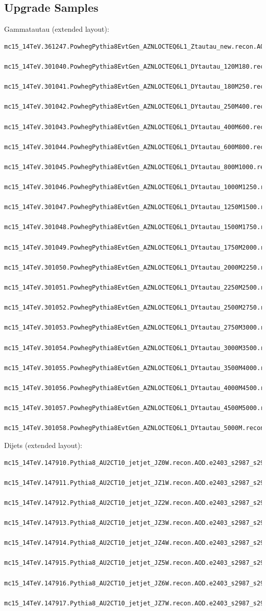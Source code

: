 \subsection{Upgrade Samples}
Gammatautau (extended layout):
\begin{lstlisting}[basicstyle=\small\ttfamily, breaklines=true]
  mc15_14TeV.361247.PowhegPythia8EvtGen_AZNLOCTEQ6L1_Ztautau_new.recon.AOD.e4805_s2987_s2999_r8820
  mc15_14TeV.301040.PowhegPythia8EvtGen_AZNLOCTEQ6L1_DYtautau_120M180.recon.AOD.e5323_s2987_s2999_r8820
  mc15_14TeV.301041.PowhegPythia8EvtGen_AZNLOCTEQ6L1_DYtautau_180M250.recon.AOD.e5323_s2987_s2999_r8820
  mc15_14TeV.301042.PowhegPythia8EvtGen_AZNLOCTEQ6L1_DYtautau_250M400.recon.AOD.e5323_s2987_s2999_r8820
  mc15_14TeV.301043.PowhegPythia8EvtGen_AZNLOCTEQ6L1_DYtautau_400M600.recon.AOD.e5323_s2987_s2999_r8820
  mc15_14TeV.301044.PowhegPythia8EvtGen_AZNLOCTEQ6L1_DYtautau_600M800.recon.AOD.e5323_s2987_s2999_r8820
  mc15_14TeV.301045.PowhegPythia8EvtGen_AZNLOCTEQ6L1_DYtautau_800M1000.recon.AOD.e5323_s2987_s2999_r8820
  mc15_14TeV.301046.PowhegPythia8EvtGen_AZNLOCTEQ6L1_DYtautau_1000M1250.recon.AOD.e5323_s2987_s2999_r8820
  mc15_14TeV.301047.PowhegPythia8EvtGen_AZNLOCTEQ6L1_DYtautau_1250M1500.recon.AOD.e5323_s2987_s2999_r8820
  mc15_14TeV.301048.PowhegPythia8EvtGen_AZNLOCTEQ6L1_DYtautau_1500M1750.recon.AOD.e5323_s2987_s2999_r8820
  mc15_14TeV.301049.PowhegPythia8EvtGen_AZNLOCTEQ6L1_DYtautau_1750M2000.recon.AOD.e5323_s2987_s2999_r8820
  mc15_14TeV.301050.PowhegPythia8EvtGen_AZNLOCTEQ6L1_DYtautau_2000M2250.recon.AOD.e5323_s2987_s2999_r8820
  mc15_14TeV.301051.PowhegPythia8EvtGen_AZNLOCTEQ6L1_DYtautau_2250M2500.recon.AOD.e5323_s2987_s2999_r8820
  mc15_14TeV.301052.PowhegPythia8EvtGen_AZNLOCTEQ6L1_DYtautau_2500M2750.recon.AOD.e5323_s2987_s2999_r8820
  mc15_14TeV.301053.PowhegPythia8EvtGen_AZNLOCTEQ6L1_DYtautau_2750M3000.recon.AOD.e5323_s2987_s2999_r8820
  mc15_14TeV.301054.PowhegPythia8EvtGen_AZNLOCTEQ6L1_DYtautau_3000M3500.recon.AOD.e5323_s2987_s2999_r8820
  mc15_14TeV.301055.PowhegPythia8EvtGen_AZNLOCTEQ6L1_DYtautau_3500M4000.recon.AOD.e5323_s2987_s2999_r8820
  mc15_14TeV.301056.PowhegPythia8EvtGen_AZNLOCTEQ6L1_DYtautau_4000M4500.recon.AOD.e5323_s2987_s2999_r8820
  mc15_14TeV.301057.PowhegPythia8EvtGen_AZNLOCTEQ6L1_DYtautau_4500M5000.recon.AOD.e5323_s2987_s2999_r8820
  mc15_14TeV.301058.PowhegPythia8EvtGen_AZNLOCTEQ6L1_DYtautau_5000M.recon.AOD.e5323_s2987_s2999_r8820
\end{lstlisting}
Dijets (extended layout):
\begin{lstlisting}[basicstyle=\small\ttfamily, breaklines=true]
  mc15_14TeV.147910.Pythia8_AU2CT10_jetjet_JZ0W.recon.AOD.e2403_s2987_s2999_r8820
  mc15_14TeV.147911.Pythia8_AU2CT10_jetjet_JZ1W.recon.AOD.e2403_s2987_s2999_r8820
  mc15_14TeV.147912.Pythia8_AU2CT10_jetjet_JZ2W.recon.AOD.e2403_s2987_s2999_r8820
  mc15_14TeV.147913.Pythia8_AU2CT10_jetjet_JZ3W.recon.AOD.e2403_s2987_s2999_r8820
  mc15_14TeV.147914.Pythia8_AU2CT10_jetjet_JZ4W.recon.AOD.e2403_s2987_s2999_r8820
  mc15_14TeV.147915.Pythia8_AU2CT10_jetjet_JZ5W.recon.AOD.e2403_s2987_s2999_r8820
  mc15_14TeV.147916.Pythia8_AU2CT10_jetjet_JZ6W.recon.AOD.e2403_s2987_s2999_r8820
  mc15_14TeV.147917.Pythia8_AU2CT10_jetjet_JZ7W.recon.AOD.e2403_s2987_s2999_r8820
\end{lstlisting}


